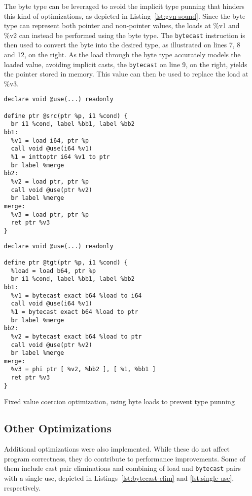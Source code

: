 \documentclass[a4paper,12pt]{article}
\begin{document}
The byte type can be leveraged to avoid the implicit type punning that hinders this kind of optimizations, as depicted in Listing~\ref{lst:gvn-sound}.
Since the byte type can represent both pointer and non-pointer values, the loads at \%v1 and \%v2 can instead be performed using the byte type.
The \texttt{bytecast} instruction is then used to convert the byte into the desired type, as illustrated on lines 7, 8 and 12, on the right.
As the load through the byte type accurately models the loaded value, avoiding implicit casts, the \texttt{bytecast} on line 9, on the right, yields the pointer stored in memory.
This value can then be used to replace the load at \%v3.

\begin{listing}[H]
  \begin{minipage}{0.48\textwidth}
    \begin{verbatim}
declare void @use(...) readonly

define ptr @src(ptr %p, i1 %cond) {
  br i1 %cond, label %bb1, label %bb2
bb1:
  %v1 = load i64, ptr %p
  call void @use(i64 %v1)
  %1 = inttoptr i64 %v1 to ptr
  br label %merge
bb2:
  %v2 = load ptr, ptr %p
  call void @use(ptr %v2)
  br label %merge
merge:
  %v3 = load ptr, ptr %p
  ret ptr %v3
}
    \end{verbatim}
  \end{minipage}
  \begin{minipage}{0.45\textwidth}
    \begin{verbatim}
declare void @use(...) readonly

define ptr @tgt(ptr %p, i1 %cond) {
  %load = load b64, ptr %p
  br i1 %cond, label %bb1, label %bb2
bb1:
  %v1 = bytecast exact b64 %load to i64
  call void @use(i64 %v1)
  %1 = bytecast exact b64 %load to ptr
  br label %merge
bb2:
  %v2 = bytecast exact b64 %load to ptr
  call void @use(ptr %v2)
  br label %merge
merge:
  %v3 = phi ptr [ %v2, %bb2 ], [ %1, %bb1 ]
  ret ptr %v3
}
    \end{verbatim}
  \end{minipage}
  \caption{Fixed value coercion optimization, using byte loads to prevent type punning}
  \label{lst:gvn-sound}
\end{listing}

\subsection{Other Optimizations}

Additional optimizations were also implemented.
While these do not affect program correctness, they do contribute to performance improvements.
Some of them include cast pair eliminations and combining of load and \texttt{bytecast} pairs with a single use, depicted in Listings~\ref{lst:bytecast-elim} and \ref{lst:single-use}, respectively.
\end{document}
